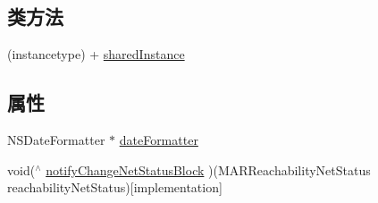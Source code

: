 \subsection*{类方法}
\begin{DoxyCompactItemize}
\item 
(instancetype) + \hyperlink{interface_m_a_r_global_manager_a38993ab2558b18ebad3c281c5b62a1c5}{shared\+Instance}
\end{DoxyCompactItemize}
\subsection*{属性}
\begin{DoxyCompactItemize}
\item 
N\+S\+Date\+Formatter $\ast$ \hyperlink{interface_m_a_r_global_manager_adb282253173b29bd426f9f429666d7f0}{date\+Formatter}
\item 
void($^\wedge$ \hyperlink{interface_m_a_r_global_manager_a07a2b4dd14fb0b527eccb178bf465501}{notify\+Change\+Net\+Status\+Block} )(M\+A\+R\+Reachability\+Net\+Status reachability\+Net\+Status){\ttfamily  \mbox{[}implementation\mbox{]}}
\end{DoxyCompactItemize}
